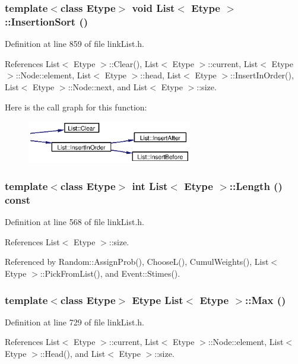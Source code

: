 \subsubsection{\setlength{\rightskip}{0pt plus 5cm}template$<$class Etype$>$ void {\bf List}$<$ Etype $>$::Insertion\-Sort ()}\label{classList_a27}




Definition at line 859 of file link\-List.h.

References List$<$ Etype $>$::Clear(), List$<$ Etype $>$::current, List$<$ Etype $>$::Node::element, List$<$ Etype $>$::head, List$<$ Etype $>$::Insert\-In\-Order(), List$<$ Etype $>$::Node::next, and List$<$ Etype $>$::size.

Here is the call graph for this function:\begin{figure}[H]
\begin{center}
\leavevmode
\includegraphics[width=204pt]{classList_a27_cgraph}
\end{center}
\end{figure}
\subsubsection{\setlength{\rightskip}{0pt plus 5cm}template$<$class Etype$>$ int {\bf List}$<$ Etype $>$::Length () const}\label{classList_a17}




Definition at line 568 of file link\-List.h.

References List$<$ Etype $>$::size.

Referenced by Random::Assign\-Prob(), Choose\-L(), Cumul\-Weights(), List$<$ Etype $>$::Pick\-From\-List(), and Event::Stimes().
\subsubsection{\setlength{\rightskip}{0pt plus 5cm}template$<$class Etype$>$ Etype {\bf List}$<$ Etype $>$::Max ()}\label{classList_a23}




Definition at line 729 of file link\-List.h.

References List$<$ Etype $>$::current, List$<$ Etype $>$::Node::element, List$<$ Etype $>$::Head(), and List$<$ Etype $>$::size.

